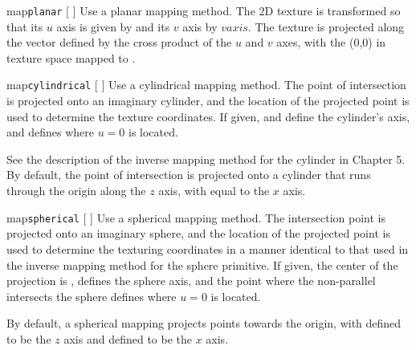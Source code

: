 \begin{defkey}{map}{{\tt planar} [  ]}
	Use a planar mapping method. The 2D texture is transformed
	so that its $u$ axis is given by  and its $v$
	axis by $vaxis$.  The texture is projected along the vector
	defined by the cross product of the $u$ and $v$ axes, with
	the (0,0) in texture space mapped to .
\end{defkey}

\begin{defkey}{map}{{\tt cylindrical} [  ]}
	Use a cylindrical mapping method.  The point of intersection
	is projected onto an imaginary cylinder, and the location
	of the projected point is used to determine the texture coordinates.
	If given,  and
	 define the cylinder's axis, and  defines
	where $u=0$ is located.
\end{defkey}
See the description of the inverse mapping method for the 
cylinder in Chapter 5.  By default, the point of intersection is
projected onto a cylinder that runs through the origin along the $z$
axis, with  equal to the $x$ axis.

\begin{defkey}{map}{{\tt spherical} [  ]}
	Use a spherical mapping method.  The intersection point is
	projected onto an imaginary sphere, and the location of the
	projected point	 is used to determine the texturing coordinates
	in a manner identical to that used in the inverse mapping method
	for the sphere primitive.
	If given, the center of
	the projection is ,  defines
	the sphere axis, and the point where the
	non-parallel  intersects the sphere
	defines where $u=0$ is located.
\end{defkey}
By default, a spherical mapping projects points towards the origin,
with  defined to be the $z$ axis and
 defined to be the $x$ axis.
